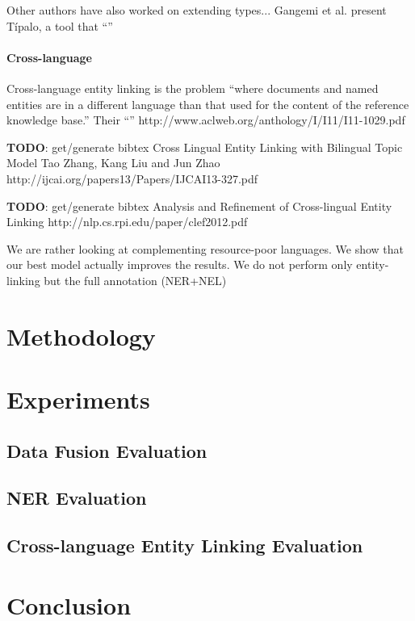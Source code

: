 \documentclass[10pt,a4paper]{article}
\newcommand{\todo}[1]{{\color{red}\textsf{\textbf{TODO}}: #1}}
\newcommand{\copypaste}[1]{``{\color{gray}{#1}}''}
\begin{document}
Other authors have also worked on extending types...
Gangemi et al. present T\'{ipalo}, a tool that \copypaste{identifies the most appropriate types for an entity by interpreting its natural language definition, which is extracted from its corresponding Wikipedia page abstract.} \cite{iswc12gangemi}


\paragraph{Cross-language}
Cross-language entity linking is the problem ``where documents and named entities are in a different language than that used for the content of the reference knowledge base.''
Their \copypaste{best model achieves performance which is 94\% of a strong monolingual baseline.}
http://www.aclweb.org/anthology/I/I11/I11-1029.pdf

\todo{get/generate bibtex}
Cross Lingual Entity Linking with Bilingual Topic Model
Tao Zhang, Kang Liu and Jun Zhao
http://ijcai.org/papers13/Papers/IJCAI13-327.pdf

\todo{get/generate bibtex}
Analysis and Refinement of Cross-lingual Entity Linking
http://nlp.cs.rpi.edu/paper/clef2012.pdf

We are rather looking at complementing resource-poor languages. 
We show that our best model actually improves the results.
We do not perform only entity-linking but the full annotation (NER+NEL)

\section{Methodology}

\section{Experiments}

\subsection{Data Fusion Evaluation}

\subsection{NER Evaluation}

\subsection{Cross-language Entity Linking Evaluation}

\section{Conclusion}




\end{document}
